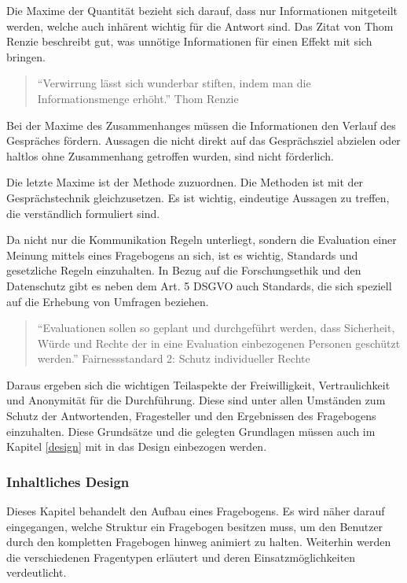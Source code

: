 Die Maxime der Quantität bezieht sich darauf, dass nur Informationen mitgeteilt werden, welche auch inhärent wichtig für die Antwort sind. Das Zitat von Thom Renzie beschreibt gut, was unnötige Informationen für einen Effekt mit sich bringen.

\begin{quote}\enquote{Verwirrung lässt sich wunderbar stiften, indem man die Informationsmenge erhöht.} Thom Renzie \end{quote}

Bei der Maxime des Zusammenhanges müssen die Informationen den Verlauf des Gespräches fördern. 
Aussagen die nicht direkt auf das Gesprächsziel abzielen oder haltlos ohne Zusammenhang getroffen wurden, sind nicht förderlich. 

Die letzte Maxime ist der Methode zuzuordnen.
Die Methoden ist mit der Gesprächstechnik gleichzusetzen. 
Es ist wichtig, eindeutige Aussagen zu treffen, die verständlich formuliert sind. 

Da nicht nur die Kommunikation Regeln unterliegt, sondern die Evaluation einer Meinung mittels eines Fragebogens an sich, ist es wichtig, Standards und gesetzliche Regeln einzuhalten. 
In Bezug auf die Forschungsethik und den Datenschutz gibt es neben dem Art. 5 DSGVO\autocite{DSGVO} %
auch Standards, die sich speziell auf die Erhebung von Umfragen beziehen.

\begin{quote} \enquote{Evaluationen sollen so geplant und durchgeführt werden, dass Sicherheit, Würde und
		Rechte der in eine Evaluation einbezogenen Personen geschützt werden.} Fairnessstandard 2: Schutz individueller Rechte\autocite{DegEval} %
	\end{quote}

Daraus ergeben sich die wichtigen Teilaspekte der Freiwilligkeit, Vertraulichkeit und Anonymität für die Durchführung\autocite[S.57]{2009Fragebogen}. %
Diese sind unter allen Umständen zum Schutz der Antwortenden, Fragesteller und den Ergebnissen des Fragebogens einzuhalten.
Diese Grundsätze und die gelegten Grundlagen müssen auch im Kapitel \vref{design} mit in das Design einbezogen werden. 

\pagebreak
\subsubsection{Inhaltliches Design}
\label{design}
Dieses Kapitel behandelt den Aufbau eines Fragebogens. 
Es wird näher darauf eingegangen, welche Struktur ein Fragebogen besitzen muss, um den Benutzer durch den kompletten Fragebogen hinweg animiert zu halten. 
Weiterhin werden die verschiedenen Fragentypen erläutert und deren Einsatzmöglichkeiten verdeutlicht. 

